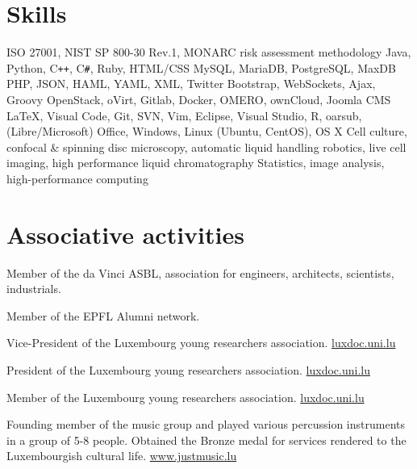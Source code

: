 \documentclass[11pt,a4paper,nolmodern,sans]{moderncv}        %
\makeatletter
\renewcommand{\tltextstart}[2][base west]{%
   \tikzset{
       tl@startyear/.style={
           font=#2,
           name=tl@startyear,
           above=\tl@textstartabove+1pt,
           inner xsep=0pt,
           anchor=#1,
       }
   }
}
\makeatother
\begin{document}

\section{Skills}

  {ISO 27001, NIST SP 800-30 Rev.1, MONARC risk assessment methodology}
    {Java, Python, C\texttt{++}, C\texttt{\#}, Ruby, HTML/CSS}
    {MySQL, MariaDB, PostgreSQL, MaxDB}
          {PHP, JSON, HAML, YAML, XML, Twitter Bootstrap, WebSockets, Ajax, Groovy}
    {OpenStack, oVirt, Gitlab, Docker, OMERO, ownCloud, Joomla CMS}
  {\LaTeX, Visual Code, Git, SVN, Vim, Eclipse, Visual Studio, R, oarsub, (Libre/Microsoft) Office, Windows, Linux (Ubuntu, CentOS), OS X}
   {Cell culture, confocal \& spinning disc microscopy, automatic liquid handling robotics, live cell imaging, high performance liquid chromatography}
   {Statistics, image analysis, high-performance computing}

\section{Associative activities}

{Member of the da Vinci ASBL, association for engineers, architects, scientists, industrials.}

{Member of the EPFL Alumni network.}

{Vice-President of the Luxembourg young researchers association. \url{luxdoc.uni.lu}}

{President of the Luxembourg young researchers association. \url{luxdoc.uni.lu}}

{Member of the Luxembourg young researchers association. \url{luxdoc.uni.lu}}
  
{Founding member of the music group and played various percussion instruments in a group of 5-8 people. Obtained the Bronze medal for services rendered to the Luxembourgish cultural life. \url{www.justmusic.lu}}
  
\nocite{*}
\printbibliography[title={Publications}]

\end{document}
